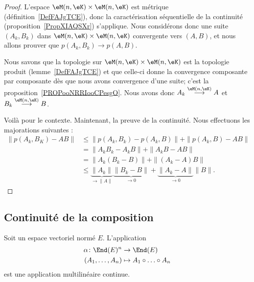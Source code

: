 \begin{proof}
	L'espace \( \eM(n,\eK)\times \eM(n,\eK)\) est métrique (définition~\ref{DefFAJgTCE}), donc la caractérisation séquentielle de la continuité (proposition~\ref{PropXIAQSXr}) s'applique. Nous considérons donc une suite \( (A_k,B_k)\) dans \( \eM(n,\eK)\times \eM(n,\eK)\) convergente vers \( (A,B)\), et nous allons prouver que \( p(A_k,B_k)\to p(A,B)\).

	Nous savons que la topologie sur \( \eM(n,\eK)\times \eM(n,\eK)\) est la topologie produit (lemme~\ref{DefFAJgTCE}) et que celle-ci donne la convergence composante par composante dès que nous avons convergence d'une suite; c'est la proposition~\ref{PROPooNRRIooCPesgO}. Nous avons donc \( A_k\stackrel{\eM(n,\eK)}{\longrightarrow}A\) et \( B_k\stackrel{\eM(n,\eK)}{\longrightarrow}B\).

	Voilà pour le contexte. Maintenant, la preuve de la continuité. Nous effectuons les majorations suivantes :
	\begin{subequations}
		\begin{align}
			\| p(A_k,B_K)-AB \| & \leq \| p(A_k,B_k)-p(A_k,B) \|+\| p(A_k,B)-AB \|                                                                   \\
			                    & =\| A_kB_k-A_kB \|+\| A_kB-AB \|                                                                                   \\
			                    & =\| A_k(B_k-B) \|+\| (A_k-A)B \|                                                                                   \\
			                    & \leq \underbrace{\| A_k \|}_{\to \| A \|}\underbrace{\| B_k-B \|}_{\to 0}+\underbrace{\| A_k-A \|}_{\to 0}\| B \|.
		\end{align}
	\end{subequations}
\end{proof}


\subsection{Continuité de la composition}

\begin{proposition}	\label{PROPooIPILooZMtYSP}
	Soit un espace vectoriel normé \( E\). L'application
	\begin{equation}
		\begin{aligned}
			\alpha\colon \End(E)^n & \to \End(E)                      \\
			(A_1,\ldots,A_n)       & \mapsto A_1\circ\ldots \circ A_n
		\end{aligned}
	\end{equation}
	est une application multilinéaire continue.
\end{proposition}

